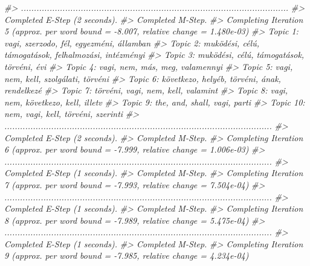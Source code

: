 \documentclass[
]{book}
\newenvironment{Shaded}{\begin{snugshade}}{\end{snugshade}}
\newcommand{\CommentTok}[1]{\textcolor[rgb]{0.56,0.35,0.01}{\textit{#1}}}
\begin{document}
\begin{Shaded}
\begin{Highlighting}[]
\CommentTok{\#\textgreater{} .......................................................................................................}
\CommentTok{\#\textgreater{} Completed E{-}Step (2 seconds). }
\CommentTok{\#\textgreater{} Completed M{-}Step. }
\CommentTok{\#\textgreater{} Completing Iteration 5 (approx. per word bound = {-}8.007, relative change = 1.480e{-}03) }
\CommentTok{\#\textgreater{} Topic 1: vagi, szerzodo, fél, egyezméni, államban }
\CommentTok{\#\textgreater{}  Topic 2: muködési, célú, támogatások, felhalmozási, intézményi }
\CommentTok{\#\textgreater{}  Topic 3: muködési, célú, támogatások, törvéni, évi }
\CommentTok{\#\textgreater{}  Topic 4: vagi, nem, más, meg, valamennyi }
\CommentTok{\#\textgreater{}  Topic 5: vagi, nem, kell, szolgálati, törvéni }
\CommentTok{\#\textgreater{}  Topic 6: következo, helyéb, törvéni, ának, rendelkezé }
\CommentTok{\#\textgreater{}  Topic 7: törvéni, vagi, nem, kell, valamint }
\CommentTok{\#\textgreater{}  Topic 8: vagi, nem, következo, kell, illetv }
\CommentTok{\#\textgreater{}  Topic 9: the, and, shall, vagi, parti }
\CommentTok{\#\textgreater{}  Topic 10: nem, vagi, kell, törvéni, szerinti }
\CommentTok{\#\textgreater{} .......................................................................................................}
\CommentTok{\#\textgreater{} Completed E{-}Step (2 seconds). }
\CommentTok{\#\textgreater{} Completed M{-}Step. }
\CommentTok{\#\textgreater{} Completing Iteration 6 (approx. per word bound = {-}7.999, relative change = 1.006e{-}03) }
\CommentTok{\#\textgreater{} .......................................................................................................}
\CommentTok{\#\textgreater{} Completed E{-}Step (1 seconds). }
\CommentTok{\#\textgreater{} Completed M{-}Step. }
\CommentTok{\#\textgreater{} Completing Iteration 7 (approx. per word bound = {-}7.993, relative change = 7.504e{-}04) }
\CommentTok{\#\textgreater{} .......................................................................................................}
\CommentTok{\#\textgreater{} Completed E{-}Step (1 seconds). }
\CommentTok{\#\textgreater{} Completed M{-}Step. }
\CommentTok{\#\textgreater{} Completing Iteration 8 (approx. per word bound = {-}7.989, relative change = 5.475e{-}04) }
\CommentTok{\#\textgreater{} .......................................................................................................}
\CommentTok{\#\textgreater{} Completed E{-}Step (1 seconds). }
\CommentTok{\#\textgreater{} Completed M{-}Step. }
\CommentTok{\#\textgreater{} Completing Iteration 9 (approx. per word bound = {-}7.985, relative change = 4.234e{-}04) }

\end{Highlighting}
\end{Shaded}
\end{document}
